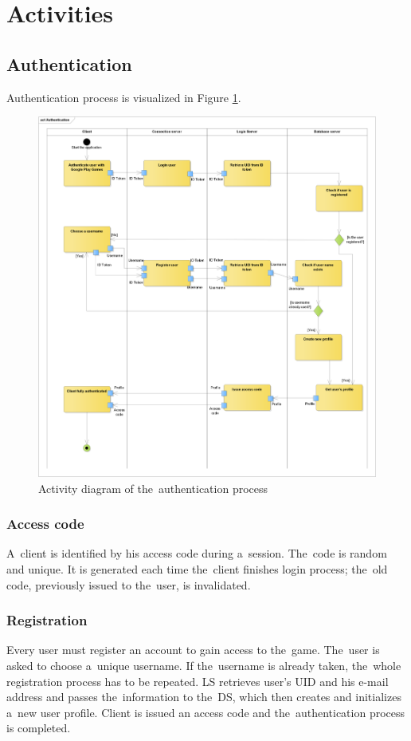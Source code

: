\section{Activities}
	\subsection{Authentication}
	Authentication process is visualized in Figure \ref{fig:adauth}.
	
	\begin{figure}[h]	
		\includegraphics[width=\textwidth]{figures/AD_Authentication}
		\centering			
		\caption{Activity diagram of the~authentication process}
		\label{fig:adauth}
	\end{figure}

		\subsubsection{Access code}
		A~client is identified by his access code during a~session. The~code is random and unique. It is generated each time the~client finishes login process; the~old code,  previously issued to the~user, is invalidated.
		
		\subsubsection{Registration}
		Every user must register an account to gain access to the~game. The~user is asked to choose a~unique username. If the~username is already taken, the~whole registration process has to be repeated. LS retrieves user's UID and his e-mail address and passes the~information to the~DS, which then creates and initializes a~new user profile. Client is issued an access code and the~authentication process is completed.
		
